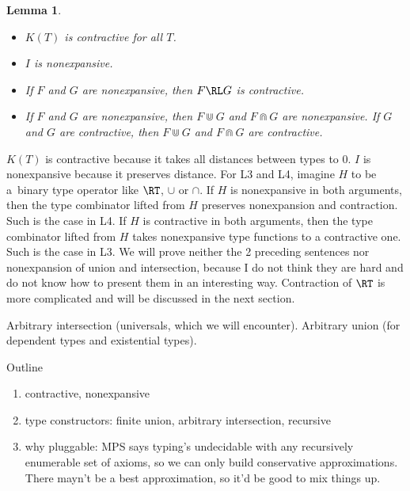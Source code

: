 \documentclass{amsart}
\newtheorem{lemma}[subsection]{Lemma}
\begin{document}
\begin{lemma}
\label{kisp}
~
\begin{itemize}
\item [L1.] $K(T)$ is contractive for all $T$.
\item [L2.] $I$ is nonexpansive.
\item [L3.] If $F$ and $G$ are nonexpansive, then $F\RL G$ is
contractive.
\item [L4.] If $F$ and $G$ are nonexpansive, then $F\Cup G$ and
$F\Cap G$ are nonexpansive. If $G$ and $G$ are contractive, then
$F\Cup G$ and $F\Cap G$ are contractive.
\end{itemize}
\end{lemma}

$K(T)$ is contractive because it takes all distances between
types to 0. $I$ is nonexpansive because it preserves distance.
For L3 and L4, imagine $H$ to be a~binary type operator like
$\RT$, $\cup$ or $\cap$. If $H$ is nonexpansive in both
arguments, then the type combinator lifted from $H$ preserves
nonexpansion and contraction. Such is the case in L4. If $H$ is
contractive in both arguments, then the type combinator lifted
from $H$ takes nonexpansive type functions to a contractive one.
Such is the case in L3. We will prove neither the 2 preceding
sentences nor nonexpansion of union and intersection, because I
do not think they are hard and do not know how to present them in
an interesting way. Contraction of $\RT$ is more complicated and
will be discussed in the next section.






Arbitrary intersection (universals, which we will encounter).
Arbitrary union (for dependent types and existential types).

%



Outline
\begin{enumerate}
\item contractive, nonexpansive
\item type constructors: finite union, arbitrary intersection,
recursive
\item why pluggable: MPS says typing's undecidable with any
recursively enumerable set of axioms, so we can only build
conservative approximations. There mayn't be a best
approximation, so it'd be good to mix things up.
\end{enumerate}
\end{document}
